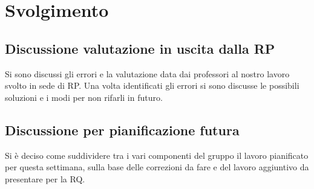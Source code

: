 \section*{Svolgimento}

\subsection*{Discussione valutazione in uscita dalla RP}
Si sono discussi gli errori e la valutazione data dai professori al nostro lavoro svolto in sede di RP. Una volta identificati gli errori si sono discusse le possibili soluzioni e i modi per non rifarli in futuro.
\subsection*{Discussione per pianificazione futura}
Si è deciso come suddividere tra i vari componenti del gruppo il lavoro pianificato per questa settimana, sulla base delle correzioni da fare e del lavoro aggiuntivo da presentare per la RQ.
